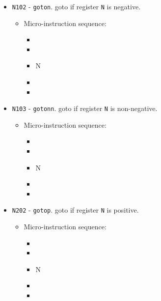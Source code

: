 \documentclass{article}
\begin{document}
\begin{itemize}
    \item \Verb|N102| - \Verb|goton|. goto if register \Verb|N| is negative.
    \begin{itemize}
        \item Micro-instruction sequence:
        \begin{itemize}
            \item \pkptroutinc
            \item \datatotmpa
            \item \regtodata N
            \item \tmpatopkifn
            \item \done
        \end{itemize}
    \end{itemize}

    \item \Verb|N103| - \Verb|gotonn|. goto if register \Verb|N| is non-negative.
    \begin{itemize}
        \item Micro-instruction sequence:
        \begin{itemize}
            \item \pkptroutinc
            \item \datatotmpa
            \item \regtodata N
            \item \tmpatopkifnn
            \item \done
        \end{itemize}
    \end{itemize}

    
    \item \Verb|N202| - \Verb|gotop|. goto if register \Verb|N| is positive.
    \begin{itemize}
        \item Micro-instruction sequence:
        \begin{itemize}
            \item \pkptroutinc
            \item \datatotmpa
            \item \regtodata N
            \item \tmpatopkifp
            \item \done
        \end{itemize}
    \end{itemize}


\end{itemize}
\end{document}
